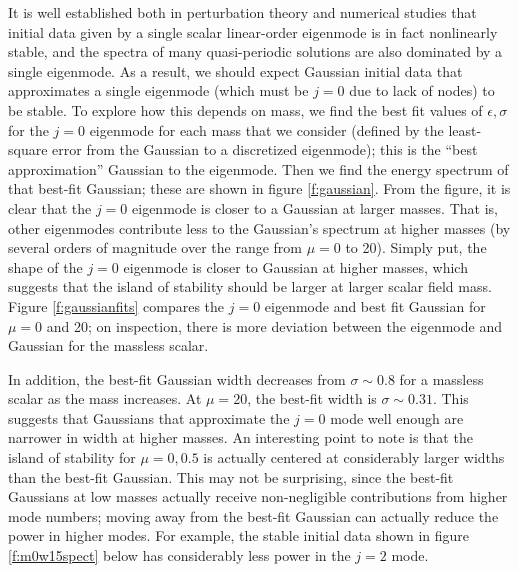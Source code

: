 \documentclass[../PhD.tex]{subfiles}
\begin{document}
It is well established both in perturbation theory and numerical studies that
initial data given by a single scalar linear-order eigenmode is in fact
nonlinearly stable, and the spectra of many quasi-periodic solutions are also
dominated by a single eigenmode.  As a result, we should expect Gaussian
initial data that approximates a single eigenmode (which must be $j=0$ due to
lack of nodes) to be stable.  To explore how this depends on mass, we find the
best fit values of $\epsilon,\sigma$ for the $j=0$ eigenmode for each mass
that we consider (defined by the least-square error from the Gaussian to a
discretized eigenmode);
this is the ``best approximation'' Gaussian to the eigenmode.
Then we find the energy spectrum of that best-fit Gaussian; these are shown
in figure \ref{f:gaussian}.  From the figure, it is clear that the $j=0$
eigenmode is closer to a Gaussian at larger masses.  That is, other
eigenmodes contribute less to the Gaussian's spectrum at higher masses (by
several orders of magnitude over the range from $\mu=0$ to 20).  Simply put,
the shape of the $j=0$ eigenmode is closer to Gaussian at higher masses,
which suggests that the island of stability should be larger at larger
scalar field mass. Figure \ref{f:gaussianfits} compares the $j=0$ eigenmode
and best fit Gaussian for $\mu=0$ and 20; on inspection, there is more
deviation between the eigenmode and Gaussian for the massless scalar.

In addition, the best-fit Gaussian width decreases from $\sigma\sim 0.8$
for a massless scalar as the mass increases.  At $\mu=20$, the best-fit
width is $\sigma\sim 0.31$. This suggests that Gaussians that approximate the
$j=0$ mode well enough are narrower in width at higher masses.  An interesting
point to note is that the island of stability for $\mu=0,0.5$ is actually
centered at considerably larger widths than the best-fit Gaussian.  This may
not be surprising, since the best-fit Gaussians at low masses actually
receive non-negligible contributions from higher mode numbers; moving away from
the best-fit Gaussian can actually reduce the power in higher modes.
For example, the stable initial data shown in figure \ref{f:m0w15spect} below
has considerably less power in the $j=2$ mode.
\end{document}
